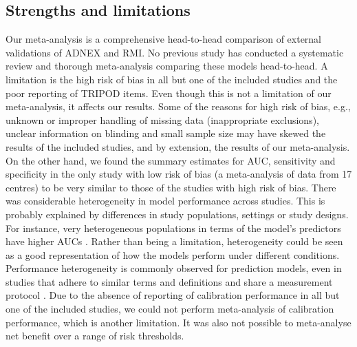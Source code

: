 \subsection{Strengths and limitations}
Our meta-analysis is a comprehensive head-to-head comparison of external validations
of \gls{ADNEX} and \gls{RMI}. No previous study has conducted a systematic review and thorough
meta-analysis comparing these models head-to-head. A limitation is the high risk of
bias in all but one of the included studies and the poor reporting of \gls{TRIPOD} items.
Even though this is not a limitation of our meta-analysis, it affects our results.
Some of the reasons for high risk of bias, e.g., unknown or improper handling of
missing data (inappropriate exclusions), unclear information on blinding and small
sample size may have skewed the results of the included studies, and by extension,
the results of our meta-analysis. On the other hand, we found the summary estimates
for \gls{AUC}, sensitivity and specificity in the only study with low risk of bias
 \cite{vancalsterValidationModelsDiagnose2020} (a meta-analysis of data from 17
centres) to be very similar to those of the studies with high risk of bias. There was
considerable heterogeneity in model performance across studies. This is probably
explained by differences in study populations, settings or study designs. For
instance, very heterogeneous populations in terms of the model's predictors have
higher \glspl{AUC} \cite{vanleeuwenInstabilityAUROCClinical2025}. Rather than being a
limitation, heterogeneity could be seen as a good representation of how the models
perform under different conditions. Performance heterogeneity is commonly observed
for prediction models, even in studies that adhere to similar terms and definitions
and share a measurement protocol
 \cite{vancalsterValidationModelsDiagnose2020}. Due to the absence of reporting of
calibration performance in all but one of the included studies, we could not perform
meta-analysis of calibration performance, which is another limitation. It was also
not possible to meta-analyse net benefit over a range of risk thresholds.

